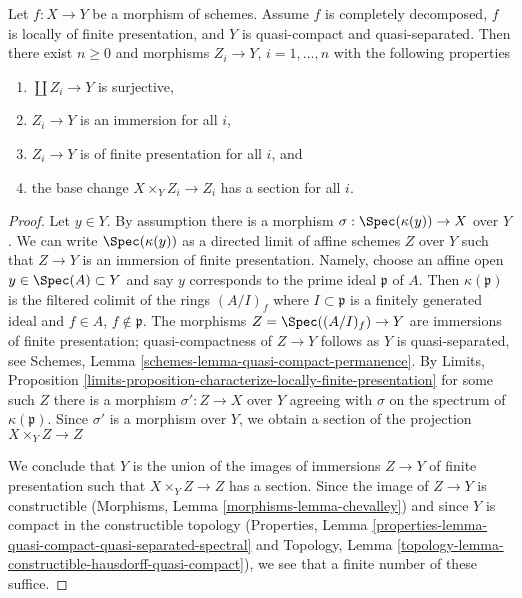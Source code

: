 \begin{lemma}
\label{lemma-decompose}
\begin{reference}
\cite[Lemma 2.1.2]{EHIK}
\end{reference}
Let $f : X \to Y$ be a morphism of schemes. Assume
$f$ is completely decomposed,
$f$ is locally of finite presentation, and
$Y$ is quasi-compact and quasi-separated.
Then there exist $n \geq 0$ and morphisms
$Z_i \to Y$, $i = 1, \ldots, n$ with the following properties
\begin{enumerate}
\item $\coprod Z_i \to Y$ is surjective,
\item $Z_i \to Y$ is an immersion for all $i$,
\item $Z_i \to Y$ is of finite presentation for all $i$, and
\item the base change $X \times_Y Z_i \to Z_i$ has a section
for all $i$.
\end{enumerate}
\end{lemma}

\begin{proof}
Let $y \in Y$. By assumption there is a morphism
$\sigma : \Spec(\kappa(y)) \to X$ over $Y$. We can write $\Spec(\kappa(y))$
as a directed limit of affine schemes $Z$ over $Y$ such that
$Z \to Y$ is an immersion of finite presentation.
Namely, choose an affine open $y \in \Spec(A) \subset Y$
and say $y$ corresponds to the prime ideal $\mathfrak p$ of $A$.
Then $\kappa(\mathfrak p)$ is the filtered colimit of
the rings $(A/I)_f$ where $I \subset \mathfrak p$ is a finitely
generated ideal and $f \in A$, $f \not \in \mathfrak p$.
The morphisms $Z = \Spec((A/I)_f) \to Y$ are immersions of
finite presentation; quasi-compactness of $Z \to Y$
follows as $Y$ is quasi-separated, see
Schemes, Lemma \ref{schemes-lemma-quasi-compact-permanence}.
By Limits, Proposition
\ref{limits-proposition-characterize-locally-finite-presentation}
for some such $Z$ there is a morphism $\sigma' : Z \to X$ over $Y$
agreeing with $\sigma$ on the spectrum of $\kappa(\mathfrak p)$.
Since $\sigma'$ is a morphism over $Y$, we obtain a section
of the projection $X \times_Y Z \to Z$

\medskip\noindent
We conclude that $Y$ is the union of the images of immersions
$Z \to Y$ of finite presentation such that $X \times_Y Z \to Z$
has a section. Since the image of $Z \to Y$ is constructible
(Morphisms, Lemma \ref{morphisms-lemma-chevalley})
and since $Y$ is compact in the constructible topology
(Properties, Lemma
\ref{properties-lemma-quasi-compact-quasi-separated-spectral} and
Topology, Lemma \ref{topology-lemma-constructible-hausdorff-quasi-compact}),
we see that a finite number of these suffice.
\end{proof}

